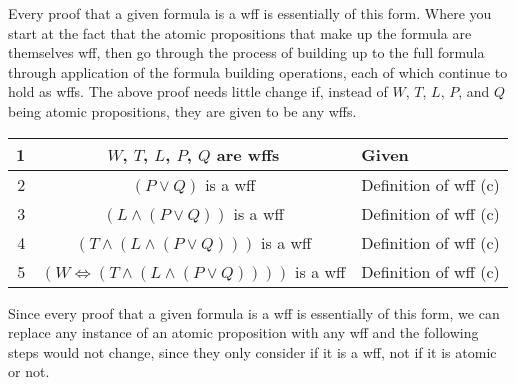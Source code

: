 \documentclass[12pt]{article}
\begin{document}
Every proof that a given formula is a wff is essentially of this form. Where you start at the fact that the atomic propositions that make up the formula are themselves wff, then go through the process of building up to the full formula through application of the formula building operations, each of which continue to hold as wffs. The above proof needs little change if, instead of $W$, $T$, $L$, $P$, and $Q$ being atomic propositions, they are given to be any wffs.

\begin{center}
    \begin{tabular}{|r|c|l|}
        \hline
        1 & $W$, $T$, $L$, $P$, $Q$ are wffs & Given\\
        \hline
        2 & $(P \lor Q)$ is a wff & Definition of wff (c)\\
        \hline
        3 & $(L \land (P \lor Q))$ is a wff & Definition of wff (c)\\
        \hline
        4 & $(T \land (L \land (P \lor Q)))$ is a wff & Definition of wff (c)\\
        \hline
        5 & $(W \iff (T \land (L \land (P \lor Q))))$ is a wff & Definition of wff (c)\\
        \hline
    \end{tabular}
\end{center}

Since every proof that a given formula is a wff is essentially of this form, we can replace any instance of an atomic proposition with any wff and the following steps would not change, since they only consider if it is a wff, not if it is atomic or not.
\end{document}
